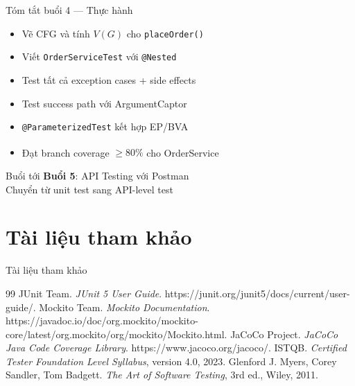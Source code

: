 \documentclass[aspectratio=169,10pt]{beamer}
\newcommand{\sref}[1]{\textsuperscript{\scriptsize\cite{#1}}}
\begin{document}
\begin{frame}{Tóm tắt buổi 4 --- Thực hành}
  \begin{itemize}
    \item Vẽ CFG và tính $V(G)$ cho \texttt{placeOrder()}
    \item Viết \texttt{OrderServiceTest} với \texttt{@Nested}
    \item Test tất cả exception cases + side effects
    \item Test success path với ArgumentCaptor
    \item \texttt{@ParameterizedTest} kết hợp EP/BVA
    \item Đạt branch coverage $\geq 80\%$ cho OrderService\sref{jacoco}
  \end{itemize}

  \vspace{0.5em}
  \begin{block}{Buổi tới}
    \textbf{Buổi 5}: API Testing với Postman\\
    Chuyển từ unit test sang API-level test
  \end{block}
\end{frame}


\section{Tài liệu tham khảo}

\begin{frame}[shrink=10]{Tài liệu tham khảo}
  \begin{thebibliography}{99}
      JUnit Team. \textit{JUnit 5 User Guide}. https://junit.org/junit5/docs/current/user-guide/.
      Mockito Team. \textit{Mockito Documentation}. https://javadoc.io/doc/org.mockito/mockito-core/latest/org.mockito/org/mockito/Mockito.html.
      JaCoCo Project. \textit{JaCoCo Java Code Coverage Library}. https://www.jacoco.org/jacoco/.
      ISTQB. \textit{Certified Tester Foundation Level Syllabus}, version 4.0, 2023.
      Glenford J. Myers, Corey Sandler, Tom Badgett. \textit{The Art of Software Testing}, 3rd ed., Wiley, 2011.
  \end{thebibliography}
\end{frame}
\end{document}
